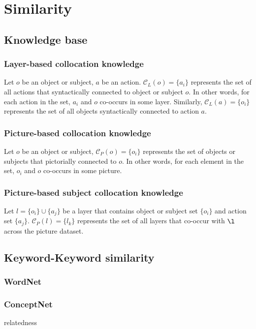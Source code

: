 \documentclass{article} %
\begin{document}
\section{Similarity}
\subsection{Knowledge base}

\subsubsection{Layer-based collocation knowledge}
Let $o$ be an object or subject, $a$ be an action.
$\mathcal{C}_L(o) = \{a_i\}$ represents the set of all actions that syntactically connected to object or subject $o$. In other words, for each action in the set, $a_i$ and $o$ co-occurs in some layer. Similarly, $\mathcal{C}_L(a) = \{o_i\}$ represents the set of all objects syntactically connected to action $a$.

\subsubsection{Picture-based collocation knowledge}
Let $o$ be an object or subject, $\mathcal{C}_P(o) = \{o_i\}$ represents the set of objects or subjects that pictorially connected to $o$. In other words, for each element in the set, $o_i$ and $o$ co-occurs in some picture.

\subsubsection{Picture-based subject collocation knowledge}
Let $l=\{o_i\}\cup\{a_j\}$ be a layer that contains object or subject set $\{o_i\}$ and action set $\{a_j\}$. 
$\mathcal{C}_P(l) = \{l_k\}$ represents the set of all layers that co-occur with $\l$ across the picture dataset.


\subsection{Keyword-Keyword similarity}
\subsubsection{WordNet}

\subsubsection{ConceptNet}
relatedness
\end{document}
